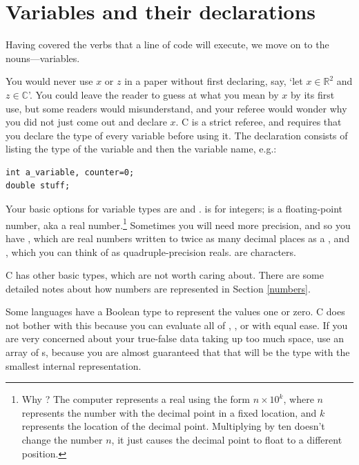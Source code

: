 \section{Variables and their declarations} \label{declaring}

Having covered the verbs that a line of code will execute, we move on
to the nouns---variables. 

You would never use $x$ or $z$ in a paper without first declaring,
say, `let $x \in {\mathbb R}^2$ and $z \in {\mathbb C}$'. You could
leave the reader to guess at what you mean by $x$ by its first use,
but some readers would misunderstand, and your referee would wonder why
you did not just come out and declare $x$. C is a strict referee, and
requires that you declare the type of every variable before using it.
The declaration consists of listing the type of the variable and then
the variable name, e.g.:

\begin{lstlisting}
int a_variable, counter=0;
double stuff;
\end{lstlisting}


Your basic options for variable types are  
and .  is for integers;
 is a floating-point number, aka a real number.\footnote{Why ? The
computer represents a real using the form $n \times 10^k$, where $n$
represents the number with the decimal point in a fixed location,
and $k$ represents the location of the decimal point.  Multiplying by
ten doesn't change the number $n$, it just causes the decimal point to
float to a different position.} Sometimes you will need more precision,
and so you have , which are real numbers written to twice
as many decimal places as a ,
and , which you can think of as quadruple-precision
reals.  are characters.	

C has other basic types, which are not worth caring about. There
are some detailed notes about how numbers are represented in Section
\ref{numbers}.

Some languages have a Boolean type to represent the values one or zero.
C does not bother with this because you can
evaluate all of , , or 
with equal ease. If you are very concerned about 
your true-false data taking up too much space, use an array of s,
because you are almost guaranteed that that will be the type with the
smallest internal representation.


